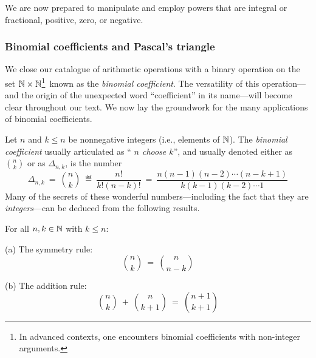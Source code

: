 \medskip

We are now prepared to manipulate and employ powers that are integral
or fractional, positive, zero, or negative.

\subsubsection{Binomial coefficients and Pascal's triangle}
\label{sec:binomial-coeff}

We close our catalogue of arithmetic operations with a binary
operation on the set $\mathbb{N} \times \mathbb{N}$\footnote{In advanced contexts, one
  encounters binomial coefficients with non-integer arguments.}~known
as the {\it binomial coefficient}.  The versatility of this
operation---and the origin of the unexpected word ``coefficient'' in
its name---will become clear throughout our text.  We now lay the
groundwork for the many applications of binomial coefficients.


\medskip

Let $n$ and $k \leq n$ be nonnegative integers (i.e., elements of
$\mathbb{N}$).  The {\it binomial coefficient} usually articulated as ``{\it
  $n$ choose $k$}'',
and usually denoted either as $\displaystyle {n \choose k}$ or as
$\Delta_{n,k}$, is the number 
\begin{equation}
\label{eq:binom-coeff}
\Delta_{n,k} \ = \
{n \choose k} \ \eqdef \ \frac{n!}{k!(n-k)!} \ = \
\frac{n(n-1)(n-2) \cdots (n-k+1)}{k (k-1)(k-2) \cdots 1}
\end{equation}
Many of the secrets of these wonderful numbers---including the fact
that they are {\em integers}---can be deduced from the following
results.

\begin{prop}
\label{thm:manipulate-binom-coeff}
For all $n, k \in \mathbb{N}$ with $k \leq n$:

{\rm (a)} The symmetry rule:
\begin{equation}
\label{eq:symmetry-binom-coeff}
{n \choose k} \ = \ {n \choose {n-k}}
\end{equation}

{\rm (b)} The addition rule:
\begin{equation}
\label{eq:add-binom-coeff}
{n \choose k} \ + \ {n \choose {k+1}} \ = \ {{n+1} \choose {k+1}}
\end{equation}
\end{prop}


